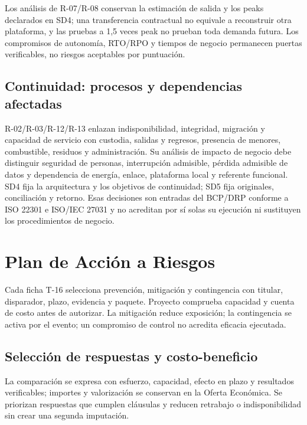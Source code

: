 Los análisis de R-07/R-08 conservan la estimación de salida y los peaks declarados en SD4; una transferencia contractual no equivale a reconstruir otra plataforma, y las pruebas a 1,5 veces peak no prueban toda demanda futura. Los compromisos de autonomía, RTO/RPO y tiempos de negocio permanecen puertas verificables, no riesgos aceptables por puntuación.







\subsection{Continuidad: procesos y dependencias afectadas}\label{sec:sd8-contexto-continuidad}
R-02/R-03/R-12/R-13 enlazan indisponibilidad, integridad, migración y capacidad de servicio con custodia, salidas y regresos, presencia de menores, combustible, residuos y administración. Su análisis de impacto de negocio debe distinguir seguridad de personas, interrupción admisible, pérdida admisible de datos y dependencia de energía, enlace, plataforma local y referente funcional. SD4 fija la arquitectura y los objetivos de continuidad; SD5 fija originales, conciliación y retorno. Esas decisiones son entradas del BCP/DRP conforme a ISO 22301 e ISO/IEC 27031 y no acreditan por sí solas su ejecución ni sustituyen los procedimientos de negocio. \parencites[Formulario T-7, apartado 10; p.~59]{sd8-ba}[RT-10.03/04; p.~22]{sd8-bt}



\section{Plan de Acción a Riesgos}
Cada ficha T-16 selecciona prevención, mitigación y contingencia con titular, disparador, plazo, evidencia y paquete. Proyecto comprueba capacidad y cuenta de costo antes de autorizar. La mitigación reduce exposición; la contingencia se activa por el evento; un compromiso de control no acredita eficacia ejecutada.

\subsection{Selección de respuestas y costo-beneficio}
La comparación se expresa con esfuerzo, capacidad, efecto en plazo y resultados verificables; importes y valorización se conservan en la Oferta Económica. Se priorizan respuestas que cumplen cláusulas y reducen retrabajo o indisponibilidad sin crear una segunda imputación. \parencite[art.~50.2, p.~29]{sd8-ba}

